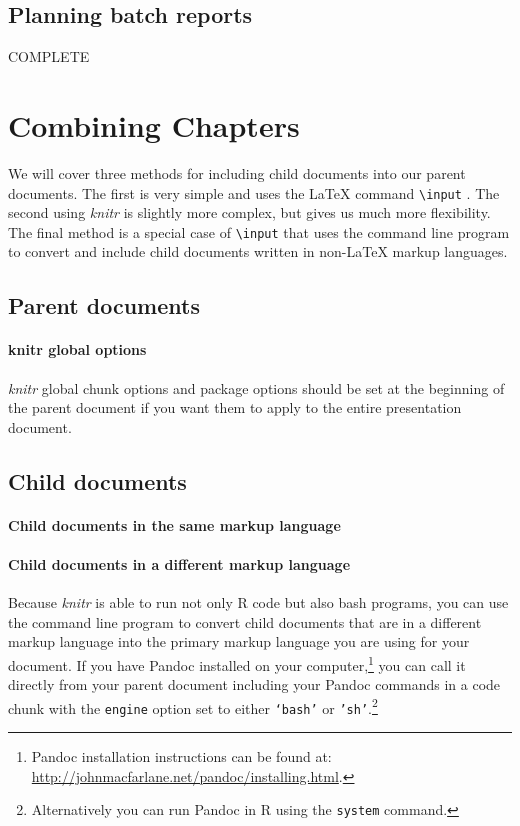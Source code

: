 \subsection{Planning batch reports}

COMPLETE

\section{Combining Chapters}

We will cover three methods for including child documents into our parent documents. The first is very simple and uses the LaTeX command \texttt{\textbackslash{}input} . The second using {\emph{knitr}} is slightly more complex, but gives us much more flexibility. The final method is a special case of \texttt{\textbackslash{}input} that uses the command line program  to convert and include child documents written in non-LaTeX markup languages. 

\subsection{Parent documents}

\paragraph{knitr global options}
{\emph{knitr}} global chunk options and package options should be set at the beginning of the parent document if you want them to apply to the entire presentation document. 

\subsection{Child documents}

\paragraph{Child documents in the same markup language}

\paragraph{Child documents in a different markup language}

Because {\emph{knitr}} is able to run not only R code but also bash programs, you can use the  command line program to convert child documents that are in a different markup language into the primary markup language you are using for your document. If you have Pandoc installed on your computer,\footnote{Pandoc installation instructions can be found at: \url{http://johnmacfarlane.net/pandoc/installing.html}.} you can call it directly from your parent document including your Pandoc commands in a code chunk with the \texttt{engine} option set to either \texttt{`bash'} or \texttt{'sh'}.\footnote{Alternatively you can run Pandoc in R using the {\tt{system}} command.} 

